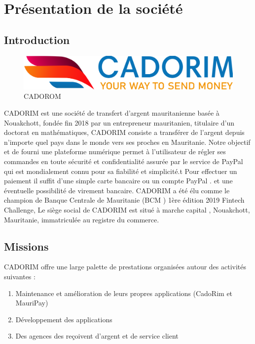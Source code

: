 \chapter{Présentation de la société}
\label{chap:introduction}
\section{Introduction}
\begin{figure}[h]
	\includegraphics[scale=0.14]{./Template LaTeX/Images/cado_logo.png}
	\centering
	\caption{CADOROM}
\end{figure}
CADORIM est une société de transfert d’argent mauritanienne basée à Nouakchott,
fondée fin 2018 par un entrepreneur mauritanien, titulaire d'un doctorat en
mathématiques,
CADORIM consiste a transférer de l’argent depuis n’importe quel pays dans le
monde vers ses proches en Mauritanie. Notre objectif et de fourni une plateforme
numérique permet à l’utilisateur de régler ses commandes en toute sécurité et
confidentialité assurée par le service de PayPal qui est mondialement connu pour sa
fiabilité et simplicité.t Pour effectuer un paiement il suffit d'une simple carte bancaire
ou un compte PayPal . et une éventuelle possibilité de virement bancaire.
CADORIM a été élu comme le champion de Banque Centrale de Mauritanie (BCM )
1ère édition 2019 Fintech Challenge,
Le siège social de CADORIM est situé à marche capital , Nouakchott, Mauritanie,
immatriculée au registre du commerce.
\section{Missions}
CADORIM offre une large palette de prestations organisées autour des activités suivantes :
\begin{enumerate}
	
	\item Maintenance et amélioration de leurs propres applications (CadoRim et MauriPay)
	\item Développement des applications 
	\item Des agences des reçoivent d'argent et de service client
	
\end{enumerate}
